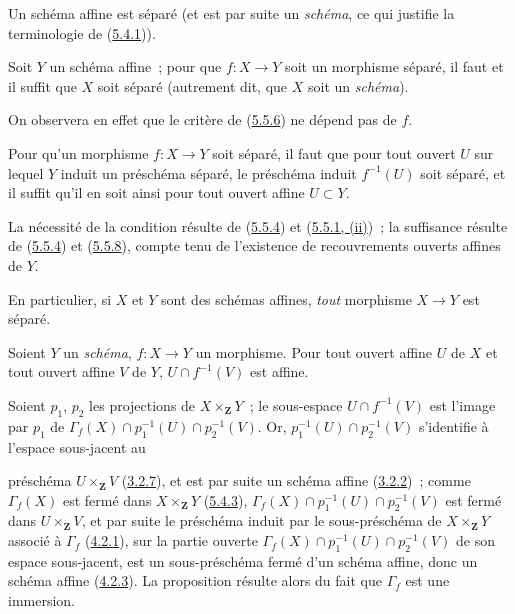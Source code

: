\begin{corollary}[5.5.7]
\label{I.5.5.7-fr}
Un schéma affine est séparé \textup{(et est par suite un \emph{schéma}, ce qui justifie la
terminologie de (\hyperref[I.5.4.1-fr]{5.4.1}))}.
\end{corollary}

\begin{corollary}[5.5.8]
\label{I.5.5.8-fr}
Soit $Y$ un schéma affine~; pour que $f:X\to Y$ soit un morphisme séparé, il
faut et il suffit que $X$ soit séparé \textup{(autrement dit, que $X$ soit un \emph{schéma})}.
\end{corollary}

On observera en effet que le critère de
(\hyperref[I.5.5.6-fr]{5.5.6}) ne dépend pas de $f$.

\begin{corollary}[5.5.9]
\label{I.5.5.9-fr}
Pour qu'un morphisme $f:X\to Y$ soit séparé, il faut que pour tout ouvert $U$
sur lequel $Y$ induit un préschéma séparé, le préschéma induit $f^{-1}(U)$
soit séparé, et il suffit qu'il en soit ainsi pour tout ouvert affine
$U\subset Y$.
\end{corollary}

La nécessité de la condition résulte de
(\hyperref[I.5.5.4-fr]{5.5.4}) et
(\hyperref[I.5.5.1-fr]{5.5.1, (ii)})~; la suffisance résulte de
(\hyperref[I.5.5.4-fr]{5.5.4}) et
(\hyperref[I.5.5.8-fr]{5.5.8}), compte tenu de l'existence de recouvrements
ouverts affines de $Y$.

En particulier, si $X$ et $Y$ sont des schémas affines, \emph{tout} morphisme
$X\to Y$ est séparé.

\begin{proposition}[5.5.10]
\label{I.5.5.10-fr}
Soient $Y$ un \emph{schéma}, $f:X\to Y$ un morphisme. Pour tout ouvert affine $U$ de
$X$ et tout ouvert affine $V$ de $Y$, $U\cap f^{-1}(V)$ est affine.
\end{proposition}

Soient $p_1$, $p_2$ les projections de $X\times_{\mathbf{Z}}Y$~; le
sous-espace $U\cap f^{-1}(V)$ est l'image par $p_1$ de
$\Gamma_f(X)\cap p_1^{-1}(U)\cap p_2^{-1}(V)$. Or,
$p_1^{-1}(U)\cap p_2^{-1}(V)$ s'identifie à l'espace sous-jacent au

préschéma $U\times_{\mathbf{Z}}V$
(\hyperref[I.3.2.7-fr]{3.2.7}), et est par suite un schéma affine
(\hyperref[I.3.2.2-fr]{3.2.2})~; comme $\Gamma_f(X)$ est fermé dans
$X\times_{\mathbf{Z}}Y$ (\hyperref[I.5.4.3-fr]{5.4.3}),
$\Gamma_f(X)\cap p_1^{-1}(U)\cap p_2^{-1}(V)$ est fermé dans
$U\times_{\mathbf{Z}}V$, et par suite le préschéma induit par le
sous-préschéma de $X\times_{\mathbf{Z}}Y$ associé à $\Gamma_f$
(\hyperref[I.4.2.1-fr]{4.2.1}), sur la partie ouverte
$\Gamma_f(X)\cap p_1^{-1}(U)\cap p_2^{-1}(V)$ de son espace sous-jacent, est
un sous-préschéma fermé d'un schéma affine, donc un schéma affine
(\hyperref[I.4.2.3-fr]{4.2.3}). La proposition résulte alors du fait que
$\Gamma_f$ est une immersion.

